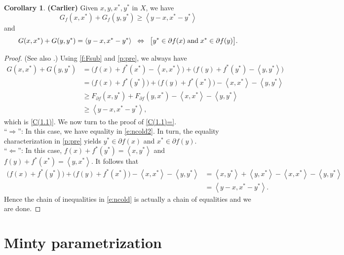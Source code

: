 \documentclass[12pt]{article}
\newcommand{\scal}[2]{\left\langle{#1},{#2}  \right\rangle}
\theoremstyle{definition}
\newtheorem{corollary}[theorem]{Corollary}
\begin{document}
{\begin{corollary} {\bf (Carlier)}
\label{p:1}
Given $x,y,x^*,y^*$ in $X$, we have 
\begin{equation}
\label{C(1.1)}
G_f(x,x^*) + G_f(y,y^*) \geq \scal{y-x}{x^*-y^*}
\end{equation}
and 
\begin{equation}
\label{C(1.1)=}
G(x,x^*) + G(y,y^*) = \scal{y-x}{x^*-y^*}
\;\;\Leftrightarrow\;\;
\big[y^*\in\partial f(x) \text{\;and\;} x^*\in\partial f(y) \big]. 
\end{equation}
\end{corollary}
\begin{proof}
(See also \cite[Section~1]{Carlier}.)
Using \cref{f:Fsub} and \cref{p:pre}, we always have 
\begin{subequations}
\label{e:ncold}
\begin{align}
G(x,x^*) + G(y,y^*)
&= \big(f(x)+f^*(x^*)-\scal{x}{x^*}\big) + \big(f(y)+f^*(y^*)-\scal{y}{y^*}\big)\\
&= \big(f(x)+f^*(y^*)\big) + \big(f(y)+f^*(x^*)\big)-\scal{x}{x^*} -
\scal{y}{y^*}\\
&\geq
F_{\partial f}(x,y^*) + F_{\partial f}(y,x^*)
-\scal{x}{x^*} - \scal{y}{y^*}\label{e:ncold1}\\
&\geq \scal{y-x}{x^*-y^*}, \label{e:ncold2}
\end{align}
\end{subequations}
which is \cref{C(1.1)}. 
We now turn to the proof of \cref{C(1.1)=}.\\
``$\Rightarrow$'': In this case, we have equality in \cref{e:ncold2}. 
In turn,
the equality characterization in \cref{p:pre} yields
$y^*\in\partial f(x)$ and $x^*\in\partial f(y)$. \\
``$\Leftarrow$'': 
In this case, 
$f(x)+f^*(y^*)=\scal{x}{y^*}$ and $f(y)+f^*(x^*)=\scal{y}{x^*}$.
It follows that 
\begin{subequations}
\begin{align}
\big(f(x)+f^*(y^*)\big) + \big(f(y)+f^*(x^*)\big)-\scal{x}{x^*} -
\scal{y}{y^*}
&= \scal{x}{y^*}+\scal{y}{x^*}-\scal{x}{x^*} - \scal{y}{y^*}\\
&= \scal{y-x}{x^*-y^*}. 
\end{align}
\end{subequations}
Hence the chain of inequalities in \cref{e:ncold} 
is actually a chain of equalities and we are done.
\end{proof}

\section{Minty parametrization}

}
\end{document}
